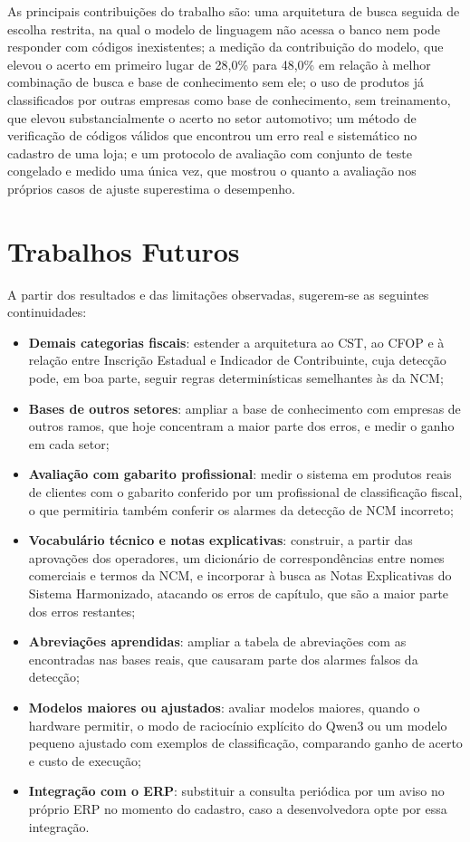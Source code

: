 As principais contribuições do trabalho são: uma arquitetura de busca seguida de escolha restrita, na qual o modelo de linguagem não acessa o banco nem pode responder com códigos inexistentes; a medição da contribuição do modelo, que elevou o acerto em primeiro lugar de 28,0\% para 48,0\% em relação à melhor combinação de busca e base de conhecimento sem ele; o uso de produtos já classificados por outras empresas como base de conhecimento, sem treinamento, que elevou substancialmente o acerto no setor automotivo; um método de verificação de códigos válidos que encontrou um erro real e sistemático no cadastro de uma loja; e um protocolo de avaliação com conjunto de teste congelado e medido uma única vez, que mostrou o quanto a avaliação nos próprios casos de ajuste superestima o desempenho.

\section{Trabalhos Futuros}

A partir dos resultados e das limitações observadas, sugerem-se as seguintes continuidades:

\begin{itemize}
    \item \textbf{Demais categorias fiscais}: estender a arquitetura ao CST, ao CFOP e à relação entre Inscrição Estadual e Indicador de Contribuinte, cuja detecção pode, em boa parte, seguir regras determinísticas semelhantes às da NCM;
    \item \textbf{Bases de outros setores}: ampliar a base de conhecimento com empresas de outros ramos, que hoje concentram a maior parte dos erros, e medir o ganho em cada setor;
    \item \textbf{Avaliação com gabarito profissional}: medir o sistema em produtos reais de clientes com o gabarito conferido por um profissional de classificação fiscal, o que permitiria também conferir os alarmes da detecção de NCM incorreto;
    \item \textbf{Vocabulário técnico e notas explicativas}: construir, a partir das aprovações dos operadores, um dicionário de correspondências entre nomes comerciais e termos da NCM, e incorporar à busca as Notas Explicativas do Sistema Harmonizado, atacando os erros de capítulo, que são a maior parte dos erros restantes;
    \item \textbf{Abreviações aprendidas}: ampliar a tabela de abreviações com as encontradas nas bases reais, que causaram parte dos alarmes falsos da detecção;
    \item \textbf{Modelos maiores ou ajustados}: avaliar modelos maiores, quando o hardware permitir, o modo de raciocínio explícito do Qwen3 ou um modelo pequeno ajustado com exemplos de classificação, comparando ganho de acerto e custo de execução;
    \item \textbf{Integração com o ERP}: substituir a consulta periódica por um aviso no próprio ERP no momento do cadastro, caso a desenvolvedora opte por essa integração.
\end{itemize}
